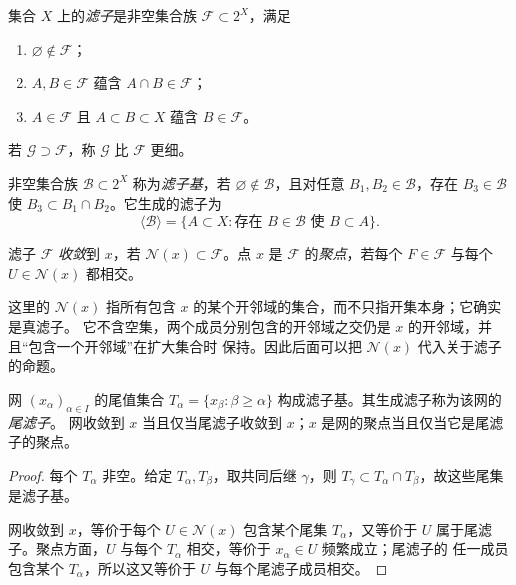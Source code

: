 \begin{definition}[滤子]\label{def:1-1-2-1}
集合 \(X\) 上的\emph{滤子}是非空集合族 \(\mathcal F\subset2^X\)，满足
\begin{enumerate}
 \item \(\varnothing\notin\mathcal F\)；
 \item \(A,B\in\mathcal F\) 蕴含 \(A\cap B\in\mathcal F\)；
 \item \(A\in\mathcal F\) 且 \(A\subset B\subset X\) 蕴含 \(B\in\mathcal F\)。
\end{enumerate}
若 \(\mathcal G\supset\mathcal F\)，称 \(\mathcal G\) 比 \(\mathcal F\) 更细。
\end{definition}

\begin{definition}[滤子基]\label{def:1-1-2-2}
非空集合族 \(\mathcal B\subset2^X\) 称为\emph{滤子基}，若
\(\varnothing\notin\mathcal B\)，且对任意 \(B_1,B_2\in\mathcal B\)，存在
\(B_3\in\mathcal B\) 使 \(B_3\subset B_1\cap B_2\)。它生成的滤子为
\[
  \langle\mathcal B\rangle
  =\{A\subset X:\text{存在 }B\in\mathcal B\text{ 使 }B\subset A\}.
\]
\end{definition}

\begin{definition}[滤子收敛与聚点]\label{def:1-1-2-3}
滤子 \(\mathcal F\) \emph{收敛}到 \(x\)，若
\(\mathcal N(x)\subset\mathcal F\)。点 \(x\) 是 \(\mathcal F\) 的\emph{聚点}，若每个
\(F\in\mathcal F\) 与每个 \(U\in\mathcal N(x)\) 都相交。
\end{definition}

这里的 $\mathcal N(x)$ 指所有包含 $x$ 的某个开邻域的集合，而不只指开集本身；它确实是真滤子。
它不含空集，两个成员分别包含的开邻域之交仍是 $x$ 的开邻域，并且“包含一个开邻域”在扩大集合时
保持。因此后面可以把 $\mathcal N(x)$ 代入关于滤子的命题。

\begin{proposition}[尾滤子]\label{proposition:1-1-2-1}
网 \((x_\alpha)_{\alpha\in I}\) 的尾值集合
\(T_\alpha=\{x_\beta:\beta\ge\alpha\}\) 构成滤子基。其生成滤子称为该网的\emph{尾滤子}。
网收敛到 \(x\) 当且仅当尾滤子收敛到 \(x\)；\(x\) 是网的聚点当且仅当它是尾滤子的聚点。
\end{proposition}
\begin{proof}
每个 \(T_\alpha\) 非空。给定 \(T_\alpha,T_\beta\)，取共同后继 \(\gamma\)，则
\(T_\gamma\subset T_\alpha\cap T_\beta\)，故这些尾集是滤子基。

网收敛到 \(x\)，等价于每个 \(U\in\mathcal N(x)\) 包含某个尾集 \(T_\alpha\)，又等价于 \(U\)
属于尾滤子。聚点方面，\(U\) 与每个 \(T_\alpha\) 相交，等价于 \(x_\alpha\in U\) 频繁成立；尾滤子的
任一成员包含某个 \(T_\alpha\)，所以这又等价于 \(U\) 与每个尾滤子成员相交。
\end{proof}

